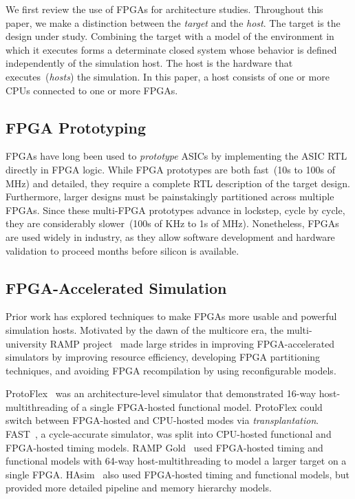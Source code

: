 
We first review the use of FPGAs for architecture studies.  Throughout
this paper, we make a distinction between the \emph{target} and
the \emph{host}.  The target is the design under study.  Combining the
target with a model of the environment in which it executes forms a
determinate closed system whose behavior is defined independently of
the simulation host.  The host is the hardware that
executes~(\emph{hosts}) the simulation.  In this paper, a host
consists of one or more CPUs connected to one or more FPGAs.

\subsection{FPGA Prototyping}
FPGAs have long been used to \emph{prototype} ASICs by implementing
the ASIC RTL directly in FPGA logic.  While FPGA prototypes are both
fast~(10s to 100s of MHz) and detailed, they require a complete RTL
description of the target design. Furthermore, larger designs must be
painstakingly partitioned across multiple FPGAs. Since these
multi-FPGA prototypes advance in lockstep, cycle by cycle, they are
considerably slower~(100s of KHz to 1s of MHz). Nonetheless, FPGAs are used widely
in industry, as they allow software development and hardware
validation to proceed months before silicon is available.

\subsection{FPGA-Accelerated Simulation}

Prior work has explored techniques to make FPGAs more usable and
powerful simulation hosts.  Motivated by the dawn of the multicore
era, the multi-university RAMP project~\cite{RAMP} made large strides
in improving FPGA-accelerated simulators by improving resource
efficiency, developing FPGA partitioning techniques, and avoiding FPGA
recompilation by using reconfigurable models.

ProtoFlex~\cite{protoflex} was an architecture-level simulator that
demonstrated 16-way host-multithreading of a single FPGA-hosted functional model.
ProtoFlex could switch between FPGA-hosted and CPU-hosted modes via
\emph{transplantation}. FAST~\cite{FAST}, a cycle-accurate simulator, was
split into CPU-hosted functional and FPGA-hosted timing models.  RAMP
Gold~\cite{RAMPGold} used FPGA-hosted timing and functional models
with 64-way host-multithreading to model a larger target on a single
FPGA.  HAsim~\cite{HASIM} also used FPGA-hosted timing and functional
models, but provided more detailed pipeline and memory hierarchy
models.

